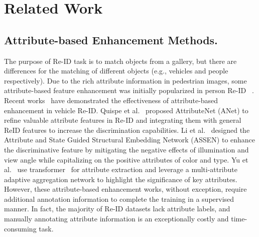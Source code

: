 \section{Related Work}
\subsection{Attribute-based Enhancement Methods.}
The purpose of Re-ID task is to match objects from a gallery, but there are differences for the matching of different objects (e.g., vehicles and people respectively). Due to the rich attribute information in pedestrian images, some attribute-based feature enhancement was initially popularized in person Re-ID ~\cite{tay2019aanet,yin2023efficient, 10555193,lin2019improving, 9733175}.
Recent works~\cite{quispe2021attributenet,li2022attribute,zhang2022graph,yu2022multi,yu2023semantic} have demonstrated the effectiveness of attribute-based enhancement in vehicle Re-ID. Quispe et al.~\cite{quispe2021attributenet} proposed AttributeNet (ANet) to refine valuable attribute features in Re-ID and integrating them with general ReID features to increase the discrimination capabilities. Li et al.~\cite{li2022attribute} designed the Attribute and State Guided Structural Embedding Network (ASSEN) to enhance the discriminative feature by mitigating the negative effects of illumination and view angle while capitalizing on the positive attributes of color and type.  
Yu et al.~\cite{yu2022multi} use transformer~\cite{vaswani2017attention} for attribute extraction and leverage a multi-attribute adaptive aggregation network to highlight the significance of key attributes. 
However, these attribute-based enhancement works, without exception, require additional annotation information to complete the training in a supervised manner.
In fact, the majority of Re-ID datasets lack attribute labels, and manually annotating attribute information is an exceptionally costly and time-consuming task.


